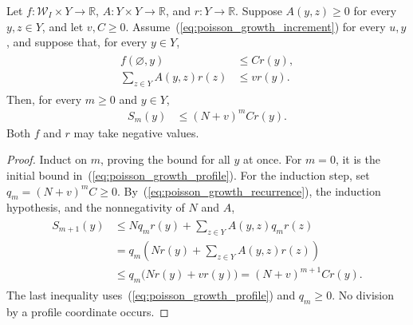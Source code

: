 \begin{theorem}
\label{thm:poisson_word_weighted_length}
\leanok
{}
Let $f:\mathcal W_I\times Y\to\mathbb R$,
$A:Y\times Y\to\mathbb R$, and $r:Y\to\mathbb R$.
Suppose $A(y,z)\geq0$ for every $y,z\in Y$, and let $v,C\geq0$.
Assume~(\ref{eq:poisson_growth_increment}) for every $u,y$, and suppose
that, for every $y\in Y$,
\begin{align}
 \begin{aligned}
 f(\varnothing,y)&\leq C r(y),\\
 \sum_{z\in Y}A(y,z)r(z)&\leq v r(y).
 \end{aligned}
 \label{eq:poisson_growth_profile}
\end{align}
Then, for every $m\geq0$ and $y\in Y$,
\begin{align}
 S_m(y)&\leq (N+v)^m C r(y).
 \label{eq:poisson_growth_length}
\end{align}
Both $f$ and $r$ may take negative values.
\end{theorem}
\begin{proof}
\leanok
{}
Induct on $m$, proving the bound for all $y$ at once.
For $m=0$, it is the initial bound in~(\ref{eq:poisson_growth_profile}).
For the induction step, set $q_m=(N+v)^m C\geq0$.
By~(\ref{eq:poisson_growth_recurrence}), the induction hypothesis,
and the nonnegativity of $N$ and $A$,
\begin{align}
 \begin{aligned}
 S_{m+1}(y)
 &\leq Nq_m r(y)+\sum_{z\in Y}A(y,z)q_m r(z)\\
 &=q_m\left(Nr(y)+\sum_{z\in Y}A(y,z)r(z)\right)\\
 &\leq q_m\bigl(Nr(y)+vr(y)\bigr)
  =(N+v)^{m+1}C r(y).
 \end{aligned}
 \label{eq:poisson_growth_induction}
\end{align}
The last inequality uses~(\ref{eq:poisson_growth_profile}) and $q_m\geq0$.
No division by a profile coordinate occurs.
\end{proof}

